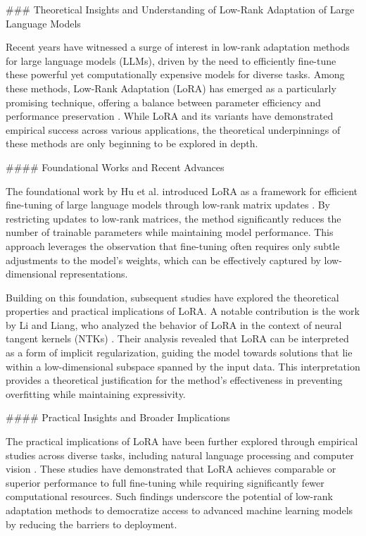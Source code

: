 \documentclass[conference]{IEEEtran}
\begin{document}
### Theoretical Insights and Understanding of Low-Rank Adaptation of Large Language Models

Recent years have witnessed a surge of interest in low-rank adaptation methods for large language models (LLMs), driven by the need to efficiently fine-tune these powerful yet computationally expensive models for diverse tasks. Among these methods, Low-Rank Adaptation (LoRA) has emerged as a particularly promising technique, offering a balance between parameter efficiency and performance preservation \cite{bX}. While LoRA and its variants have demonstrated empirical success across various applications, the theoretical underpinnings of these methods are only beginning to be explored in depth.

#### Foundational Works and Recent Advances

The foundational work by Hu et al. introduced LoRA as a framework for efficient fine-tuning of large language models through low-rank matrix updates \cite{bX}. By restricting updates to low-rank matrices, the method significantly reduces the number of trainable parameters while maintaining model performance. This approach leverages the observation that fine-tuning often requires only subtle adjustments to the model's weights, which can be effectively captured by low-dimensional representations.

Building on this foundation, subsequent studies have explored the theoretical properties and practical implications of LoRA. A notable contribution is the work by Li and Liang, who analyzed the behavior of LoRA in the context of neural tangent kernels (NTKs) \cite{bX}. Their analysis revealed that LoRA can be interpreted as a form of implicit regularization, guiding the model towards solutions that lie within a low-dimensional subspace spanned by the input data. This interpretation provides a theoretical justification for the method's effectiveness in preventing overfitting while maintaining expressivity.

#### Practical Insights and Broader Implications

The practical implications of LoRA have been further explored through empirical studies across diverse tasks, including natural language processing and computer vision \cite{bX}. These studies have demonstrated that LoRA achieves comparable or superior performance to full fine-tuning while requiring significantly fewer computational resources. Such findings underscore the potential of low-rank adaptation methods to democratize access to advanced machine learning models by reducing the barriers to deployment.
\end{document}
